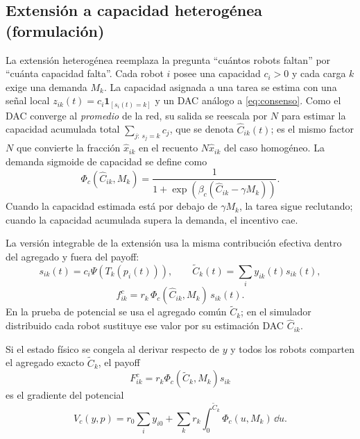 \subsection{Extensión a capacidad heterogénea (formulación)}
\label{subsec:heterogenea}

La extensión heterogénea reemplaza la pregunta ``cuántos robots faltan'' por ``cuánta
capacidad falta''. Cada robot $i$ posee una capacidad $c_i>0$ y cada carga $k$ exige una
demanda $M_k$. La capacidad asignada a una tarea se estima con una señal local
$z_{ik}(t)=c_i\mathbf{1}_{[s_i(t)=k]}$ y un DAC análogo a \eqref{eq:consenso}. Como el
DAC converge al \emph{promedio} de la red, su salida se reescala por $N$ para estimar la
capacidad acumulada total $\sum_{j:\,s_j=k} c_j$, que se denota $\hat{C}_{ik}(t)$; es el
mismo factor $N$ que convierte la fracción $\hat{x}_{ik}$ en el recuento $N\hat{x}_{ik}$
del caso homogéneo. La demanda sigmoide de capacidad se define como
\begin{equation}
  \Phi_c(\hat{C}_{ik},M_k)=
  \frac{1}{1+\exp\!\left(\beta_c(\hat{C}_{ik}-\gamma M_k)\right)}.
  \label{eq:sigmoid_capacity}
\end{equation}
Cuando la capacidad estimada está por debajo de $\gamma M_k$, la tarea sigue
reclutando; cuando la capacidad acumulada supera la demanda, el incentivo cae.

La versión integrable de la extensión usa la misma contribución efectiva dentro del
agregado y fuera del payoff:
\begin{equation}
  s_{ik}(t)=c_i\Psi\!\left(T_k(p_i(t))\right),
  \qquad
  \widetilde C_k(t)=\sum_i y_{ik}(t)s_{ik}(t),
  \label{eq:capacidad_efectiva_impl}
\end{equation}
\begin{equation}
  f^c_{ik}=r_k\,\Phi_c(\widehat C_{ik},M_k)\,s_{ik}(t).
  \label{eq:payoff_capacity}
\end{equation}
En la prueba de potencial se usa el agregado común $\widetilde C_k$; en el simulador
distribuido cada robot sustituye ese valor por su estimación DAC $\widehat C_{ik}$.

\begin{proposicion}
\label{prop:potencial_capacidad_efectiva}
Si el estado físico se congela al derivar respecto de $y$ y todos los robots comparten
el agregado exacto $\widetilde C_k$, el payoff
\[
  F^c_{ik}=r_k\Phi_c(\widetilde C_k,M_k)s_{ik}
\]
es el gradiente del potencial
\begin{equation}
  V_c(y,p)=
  r_0\sum_i y_{i0}
  +
  \sum_k r_k
  \int_0^{\widetilde C_k}\Phi_c(u,M_k)\,\dd u .
  \label{eq:potencial_capacidad_efectiva}
\end{equation}
\end{proposicion}

